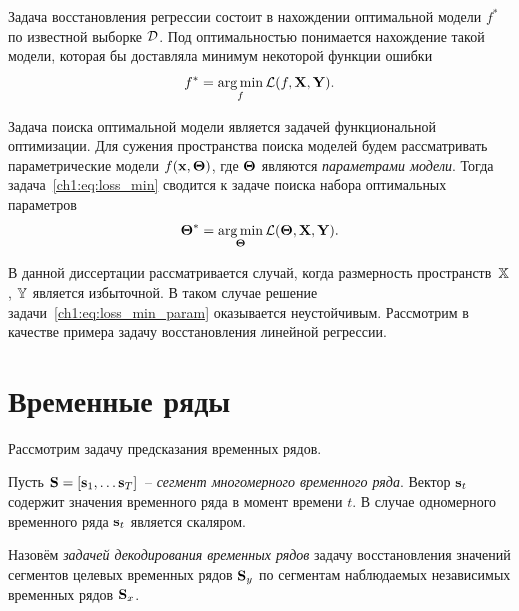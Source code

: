 Задача восстановления регрессии состоит в нахождении оптимальной модели $f^*$ по известной выборке $\mathcal{D}$. Под оптимальностью понимается нахождение такой модели, которая бы доставляла минимум некоторой функции ошибки
\begin{equation}
	f^* = \mathop{\arg \min}\limits_f \mathcal{L}(f, \mathbf{X}, \mathbf{Y}).
	\label{ch1:eq:loss_min}
\end{equation}

Задача поиска оптимальной модели является задачей функциональной оптимизации. 
Для сужения пространства поиска моделей будем рассматривать параметрические модели $f(\mathbf{x}, \boldsymbol{\Theta})$, где $\boldsymbol{\Theta}$ являются \textit{параметрами модели}. 
Тогда задача~\eqref{ch1:eq:loss_min} сводится к задаче поиска набора оптимальных параметров
\begin{equation}
\boldsymbol{\Theta}^* = \mathop{\arg \min}\limits_{\boldsymbol{\Theta}} \mathcal{L}(\boldsymbol{\Theta}, \mathbf{X}, \mathbf{Y}).
\label{ch1:eq:loss_min_param}
\end{equation}

В данной диссертации рассматривается случай, когда размерность пространств~$\mathbb{X}$, $\mathbb{Y}$ является избыточной. 
В таком случае решение задачи~\eqref{ch1:eq:loss_min_param} оказывается неустойчивым. 
Рассмотрим в качестве примера задачу восстановления линейной регрессии.

\section{Временные ряды}
\label{ch1:time_series}

Рассмотрим задачу предсказания временных рядов. 

\begin{definition}
Пусть $\mathbf{S} = [\mathbf{s}_1, \dots \mathbf{s}_T]$~-- \textit{сегмент многомерного временного ряда}.
Вектор $\mathbf{s}_t$ содержит значения временного ряда в момент времени $t$. 
В случае одномерного временного ряда $\mathbf{s}_t$ является скаляром.
\end{definition}

\begin{definition}
	Назовём \textit{задачей декодирования временных рядов} задачу восстановления значений сегментов целевых временных рядов $\mathbf{S}_y$ по сегментам наблюдаемых независимых временных рядов $\mathbf{S}_x$.
\end{definition}


